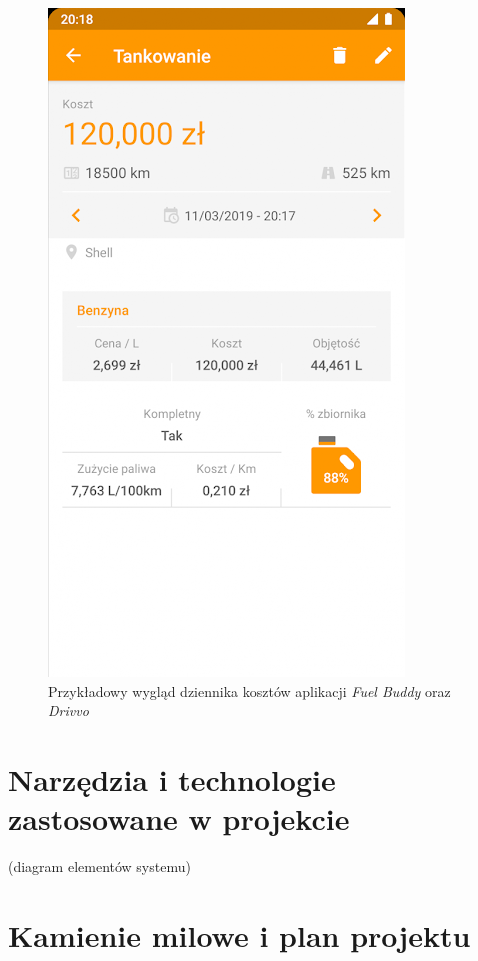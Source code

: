 \documentclass[12pt]{article}
\begin{document}
\begin{figure}
		\includegraphics[scale=0.7]{mob2.png}
	\caption{Przykładowy wygląd dziennika kosztów aplikacji \textit{Fuel Buddy} \cite{fuel} oraz \textit{Drivvo} \cite{drivvo}}
	\label{mob}
\end{figure}


 


\newpage
\section{Narzędzia i technologie zastosowane w projekcie}
(diagram elementów systemu)


\newpage
\section{Kamienie milowe i plan projektu}
\end{document}
